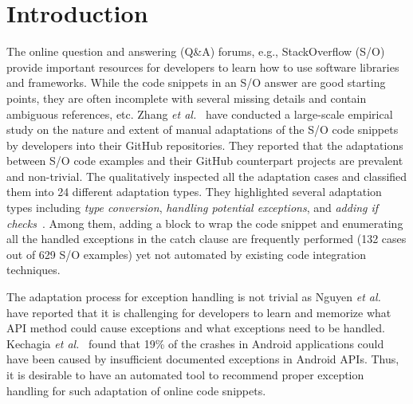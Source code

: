 \section{Introduction}
\label{sec:intro}

The online question and answering (Q\&A) forums, e.g., StackOverflow
(S/O) provide important resources for developers to learn how to use
software libraries and frameworks. While the code snippets in an S/O
answer are good starting points, they are often incomplete with
several missing details and contain ambiguous references, etc.  Zhang
{\em et al.}~\cite{zhang-icse19} have conducted a large-scale
empirical study on the nature and extent of manual adaptations of the
S/O code snippets by developers into their GitHub repositories.  They
reported that the adaptations between S/O code examples and their
GitHub counterpart projects are prevalent and non-trivial. The
qualitatively inspected all the adaptation cases and classified them
into 24 different adaptation types. They highlighted several
adaptation types including {\em type conversion}, {\em handling
  potential exceptions}, and {\em adding if
  checks}~\cite{zhang-icse19}. Among them, adding a 
block to wrap the code snippet and enumerating all the handled
exceptions in the catch clause are frequently performed (132 cases out
of 629 S/O examples) yet not automated by existing code integration
techniques.

The adaptation process for exception handling is not trivial as Nguyen
{\em et al.}~\cite{xrank-fse20} have reported that it is challenging
for developers to learn and memorize what API method could cause
exceptions and what exceptions need to be handled. Kechagia {\em et
  al.}~\cite{kechagia-msr14} found that 19\% of the crashes in Android
applications could have been caused by insufficient documented
exceptions in Android APIs. Thus, it is desirable to have an automated
tool to recommend proper exception handling for such adaptation of
online code snippets.

